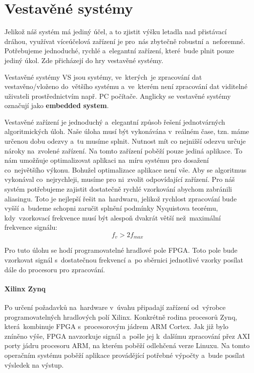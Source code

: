 		\section{Vestavěné systémy}
			Jelikož náš systém má jediný účel, a to zjistit výšku letadla nad přistávací dráhou, využívat víceúčelová zařízení je pro~nás zbytečně robustní a~neforemné. Potřebujeme jednoduché, rychlé a~elegantní zařízení, které~bude plnit pouze jediný úkol. Zde přicházejí do hry vestavěné systémy.
			
			\begin{definice}
				Vestavěné systémy VS jsou systémy, ve~kterých~je zpracování dat vestavěno/vloženo do~většího systému a~ve~kterém není zpracování dat viditelné uživateli prostřednictvím např. PC počítače. Anglicky se vestavěné systémy označují jako \textbf{embedded system}\cite{impSkripta}.
			\end{definice}
			
			Vestavěné zařízení je jednoduchý a~elegantní způsob řešení jednotvárných algoritmických úloh. Naše úloha musí být vykonávána v~reálném čase, tzn. máme určenou dobu odezvy a~tu musíme splnit. Nutnost mít co nejnižší odezvu určuje nároky na~zvolené zařízení. Na tomto zařízení poběží pouze jediná aplikace. To nám umožňuje optimalizovat aplikaci na~míru systému pro dosažení co~největšího výkonu.
			Bohužel optimalizace aplikace není vše. Aby se algoritmus vykonával co~nejrychleji, musíme pro ni~zvolit odpovídající zařízení. Pro náš systém potřebujeme zajistit dostatečně rychlé vzorkování abychom zabránili aliasingu. Toto je nejlepší řešit na~hardwaru, jelikož rychlost zpracování bude vyšší a~budeme schopni zaručit splnění podmínky Nyquistova teorému, kdy~vzorkovací frekvence musí být alespoň dvakrát větší než~maximální frekvence signálu: \[f_v > 2f_{max}\]
			
			Pro tuto úlohu se hodí programovatelné hradlové pole FPGA. Toto pole bude vzorkovat signál s~dostatečnou frekvencí a~po sběrnici jednotlivé vzorky posílat dále do procesoru pro zpracování.\par
			
			\paragraph{Xilinx Zynq}
				Po určení požadavků na~hardware v~úvahu připadají zařízení od~výrobce programovatelných hradlových polí Xilinx. Konkrétně rodina procesorů Zynq, která~kombinuje FPGA s~procesorovým jádrem ARM Cortex.
				Jak již bylo zníněno výše, FPGA navzorkuje signál a~pošle jej k~dalšímu zpracování přez AXI porty jádru procesoru ARM, na kterém poběží odlehčená verze Linuxu. Na tomto operačním systému poběží aplikace provádějící potřebné výpočty a~bude posílat výsledek na výstup.
				
